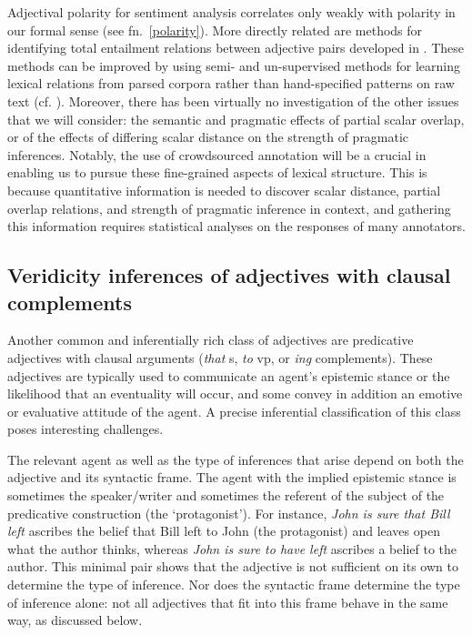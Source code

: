 \documentclass[10pt]{article}
\begin{document}
Adjectival polarity for sentiment analysis \cite{williams2009predicting}
correlates only weakly with polarity in our formal sense (see fn.\ \ref{polarity}). More directly related are methods for identifying total entailment relations between adjective pairs developed in \cite{sheinman2009adjscales,sheinmanetal2013}. 
These methods can be improved 
by using semi- and un-supervised methods for learning lexical relations from parsed corpora rather than hand-specified patterns on raw text (cf. \cite{snow04,davidov2008unsupervised,turney2008uniform}). Moreover, there has been virtually no investigation of the other issues that we will consider: the semantic and pragmatic effects of partial scalar overlap, or of the effects of differing scalar distance on the strength of pragmatic inferences. Notably, the use of crowdsourced annotation will be a crucial in enabling us to pursue these fine-grained aspects of lexical structure. This is because quantitative information is needed to discover scalar distance, partial overlap relations, and strength of pragmatic inference in context, and gathering this information requires 
statistical analyses on the responses of many annotators.

\vspace {-3mm}

\subsection{Veridicity inferences of adjectives with clausal complements}
\vspace {-2mm}

Another common and inferentially rich class of adjectives are predicative adjectives with clausal arguments (\emph{that} {\sc s}, \emph{to} {\sc vp}, or \emph{ing} complements). These adjectives are typically used to communicate an agent's epistemic stance or the likelihood that an eventuality will occur, and some convey in addition an emotive or evaluative attitude of the agent. 
A precise inferential classification of this class poses interesting challenges.

The relevant agent as well as the type of inferences that arise depend
on both the adjective and its syntactic frame.  The agent with the
implied epistemic stance is sometimes the speaker/writer and sometimes
the referent of the subject of the predicative construction (the
`protagonist').  For instance, \textit{John is sure that Bill left}
ascribes the belief that Bill left to John (the protagonist) and
leaves open what the author thinks, whereas \textit{John is sure to have
left} ascribes a belief to the author. This minimal pair shows that the adjective is not sufficient on its own to determine the type of inference. 
Nor does the syntactic frame determine the type of inference alone: not all adjectives that fit into this frame behave in the same way, as discussed below.
\end{document}
